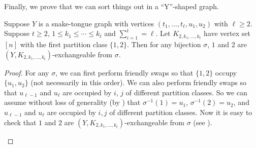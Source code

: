 \documentclass{mystyle}
\begin{document}
Finally, we prove that we can sort things out in a ``Y''-shaped graph. 
\begin{proposition}\label{prop_y_exchangeable}
    Suppose $Y$ is a snake-tongue graph with vertices $(t_1, \ldots, t_\ell, u_1, u_2)$ with $\ell \geq 2$. Suppose $t \geq 2$, $1 \leq k_1 \leq \cdots \leq k_t$ and $\sum_{i = 1}^{t} = \ell$. Let $K_{2, k_1, \ldots, k_t}$ have vertex set $[n]$ with the first partition class $\{1, 2\}$. Then for any bijection $\sigma$, $1$ and $2$ are $(Y, K_{2, k_1, \ldots, k_t})$-exchangeable from $\sigma$. 
\end{proposition}
\begin{proof}
    For any $\sigma$, we can first perform friendly swaps so that $\{1, 2\}$ occupy $\{u_1, u_2\}$ (not necessarily in this order). We can also perform friendly swaps so that $u_{\ell - 1}$ and $u_{\ell}$ are occupied by $i$, $j$ of different partition classes. So we can assume without loss of generality (by ) that $\sigma^{-1}(1) = u_1$, $\sigma^{-1}(2) = u_2$, and $u_{\ell - 1}$ and $u_{\ell}$ are occupied by $i, j$ of different partition classes. Now it is easy to check that $1$ and $2$ are $(Y, K_{2, k_1, \ldots, k_t})$-exchangeable from $\sigma$ (see ). 
    \begin{figure}[ht]
        \centering
\end{figure}
\end{proof}
\end{document}
